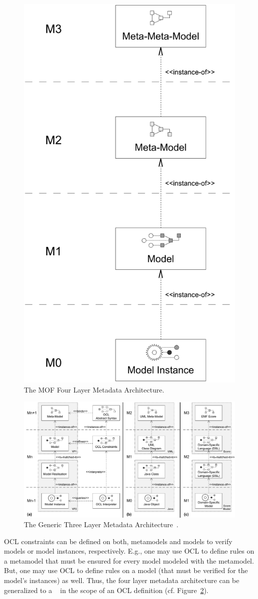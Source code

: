 \begin{figure}[!t]
	\centering
	\includegraphics[width=.4\linewidth]{figures/architecture/mofLayers}
	\caption{The MOF Four Layer Metadata Architecture.}
	\label{pic:architecture:mofLayers}
\end{figure}

\begin{figure}
	\centering
	\includegraphics[width=1.0\linewidth]{figures/architecture/genericLayers}
	\caption{The Generic Three Layer Metadata
	Architecture~\cite{wilkeEA:MODELS2010}.}
	\label{pic:architecture:genericLayers}
\end{figure}

\acs{OCL} constraints can be defined on both, metamodels and models to verify 
models or model instances, respectively. E.g., one may use \acs{OCL} to define 
rules on a metamodel that must be ensured for every model modeled with the 
metamodel. But, one may use \acs{OCL} to define rules on a model (that must be
verified for the model's instances) as well. Thus, the four layer metadata 
architecture can be generalized to a ~\cite{demuth:RGWS09} in the scope of an \acs{OCL} definition (cf. 
Figure~\ref{pic:architecture:genericLayers}). 

